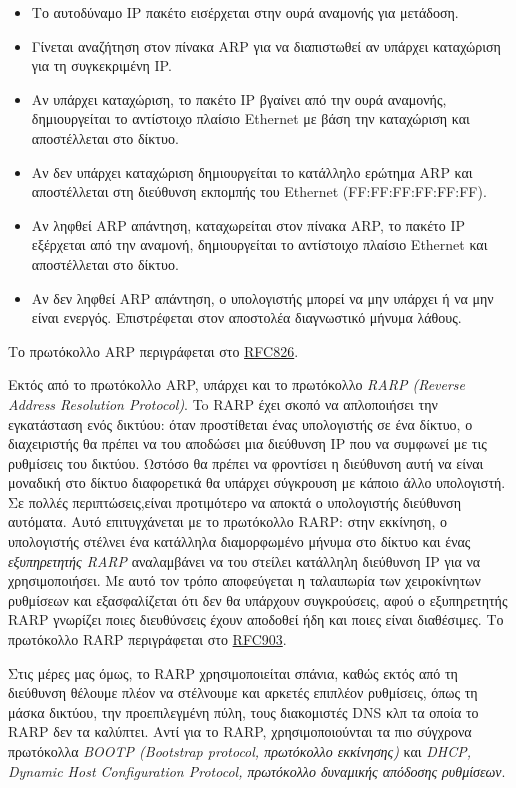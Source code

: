 \begin{itemize}
\item Το αυτοδύναμο IP πακέτο εισέρχεται στην ουρά αναμονής για μετάδοση.
\item Γίνεται αναζήτηση στον πίνακα ARP για να διαπιστωθεί αν υπάρχει καταχώριση για τη συγκεκριμένη IP.
\item Αν υπάρχει καταχώριση, το πακέτο IP βγαίνει από την ουρά αναμονής, δημιουργείται το αντίστοιχο πλαίσιο Ethernet με βάση την καταχώριση και αποστέλλεται στο δίκτυο.
\item Αν δεν υπάρχει καταχώριση δημιουργείται το κατάλληλο ερώτημα ARP και αποστέλλεται στη διεύθυνση εκπομπής του Ethernet (FF:FF:FF:FF:FF:FF).
\item Αν ληφθεί ARP απάντηση, καταχωρείται στον πίνακα ARP, το πακέτο IP εξέρχεται από την αναμονή, δημιουργείται το αντίστοιχο πλαίσιο Ethernet και αποστέλλεται στο δίκτυο.
\item Αν δεν ληφθεί ARP απάντηση, ο υπολογιστής μπορεί να μην υπάρχει ή να μην είναι ενεργός. Επιστρέφεται στον αποστολέα διαγνωστικό μήνυμα λάθους.
\end{itemize}

Το πρωτόκολλο ARP περιγράφεται στο \href{https://www.ietf.org/rfc/rfc826.txt}{RFC826}.

Εκτός από το πρωτόκολλο ARP, υπάρχει και το πρωτόκολλο \emph{RARP (Reverse Address Resolution Protocol)}. To RARP έχει σκοπό να απλοποιήσει την εγκατάσταση ενός δικτύου: όταν προστίθεται ένας υπολογιστής σε ένα δίκτυο, ο διαχειριστής θα πρέπει να του αποδώσει μια διεύθυνση IP που να συμφωνεί με τις ρυθμίσεις του δικτύου. Ωστόσο θα πρέπει να φροντίσει η διεύθυνση αυτή να είναι μοναδική στο δίκτυο διαφορετικά θα υπάρχει σύγκρουση με κάποιο άλλο υπολογιστή. Σε πολλές περιπτώσεις,είναι προτιμότερο να αποκτά ο υπολογιστής διεύθυνση αυτόματα. Αυτό επιτυγχάνεται με το πρωτόκολλο RARP: στην εκκίνηση, ο υπολογιστής στέλνει ένα κατάλληλα διαμορφωμένο μήνυμα στο δίκτυο και ένας \emph{εξυπηρετητής RARP} αναλαμβάνει να του στείλει κατάλληλη διεύθυνση IP για να χρησιμοποιήσει. Με αυτό τον τρόπο αποφεύγεται η ταλαιπωρία των χειροκίνητων ρυθμίσεων και εξασφαλίζεται ότι δεν θα υπάρχουν συγκρούσεις, αφού ο εξυπηρετητής RARP γνωρίζει ποιες διευθύνσεις έχουν αποδοθεί ήδη και ποιες είναι διαθέσιμες. Το πρωτόκολλο RARP περιγράφεται στο \href{https://www.ietf.org/rfc/rfc903.txt}{RFC903}.

Στις μέρες μας όμως, το RARP χρησιμοποιείται σπάνια, καθώς εκτός από τη διεύθυνση θέλουμε πλέον να στέλνουμε και αρκετές επιπλέον ρυθμίσεις, όπως τη μάσκα δικτύου, την προεπιλεγμένη πύλη, τους διακομιστές DNS κλπ τα οποία το RARP δεν τα καλύπτει. Αντί για το RARP, χρησιμοποιούνται τα πιο σύγχρονα πρωτόκολλα \emph{BOOTP (Bootstrap protocol, πρωτόκολλο εκκίνησης)} και \emph{DHCP, Dynamic Host Configuration Protocol, πρωτόκολλο δυναμικής απόδοσης ρυθμίσεων}.

